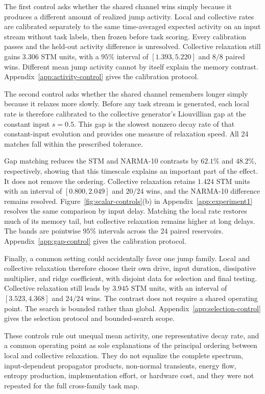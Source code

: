 The first control asks whether the shared channel wins simply because it
produces a different amount of realized jump activity. Local and collective
rates are calibrated separately to the same time-averaged expected activity
on an input stream without task labels, then frozen before task scoring. Every
calibration passes and the held-out activity difference is unresolved.
Collective relaxation still gains \(3.306\) STM units, with a \(95\%\)
interval of \([1.393,5.220]\) and \(8/8\) paired wins. Different mean jump
activity cannot by itself explain the memory contrast.
Appendix~\ref{app:activity-control} gives the calibration protocol.

The second control asks whether the shared channel remembers longer simply
because it relaxes more slowly. Before
any task stream is generated, each local rate is therefore calibrated to the
collective generator's Liouvillian gap at the constant input \(s=0.5\). This
gap is the slowest nonzero decay rate of that constant-input evolution and
provides one measure of relaxation speed. All 24 matches fall within the
prescribed tolerance.

Gap matching reduces the STM and NARMA-10 contrasts by \(62.1\%\) and
\(48.2\%\), respectively, showing that this timescale explains an important
part of the effect. It does not remove the ordering. Collective relaxation
retains \(1.424\) STM units with an interval of \([0.800,2.049]\) and \(20/24\)
wins, and the NARMA-10 difference remains resolved.
Figure~\ref{fig:scalar-controls}(b) in Appendix~\ref{app:experiment1}
resolves the same comparison by input delay. Matching the local rate restores
much of its memory tail, but
collective relaxation remains higher at long delays. The bands are pointwise
\(95\%\) intervals across the 24 paired reservoirs.
Appendix~\ref{app:gap-control} gives the calibration protocol.

Finally, a common setting could accidentally favor one jump family. Local and
collective relaxation therefore choose their own drive, input duration,
dissipative multiplier, and ridge coefficient, with disjoint data for
selection and final testing. Collective relaxation still leads by \(3.945\)
STM units, with an interval of \([3.523,4.368]\) and \(24/24\) wins. The
contrast does not require a shared operating point. The search is bounded
rather than global. Appendix~\ref{app:selection-control} gives the selection
protocol and bounded-search scope.

These controls rule out unequal mean activity, one representative decay rate,
and a common operating point as sole explanations of the principal ordering
between local and collective relaxation. They do not equalize the complete spectrum,
input-dependent propagator products, non-normal transients, energy flow,
entropy production, implementation effort, or hardware cost, and they were
not repeated for the full cross-family task map.

